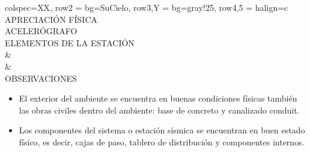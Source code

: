 \begin{tblr}{
        colspec={XX},
        row{2} = {bg=SuCielo},
        row{3,Y} = {bg=gray!25},
        row{4,5} = {halign=c}
    }
     APRECIACIÓN FÍSICA \\
     ACELERÓGRAFO \MakeUppercase{} \\
     ELEMENTOS DE LA ESTACIÓN \\
     &
     \\
     &
     \\
     OBSERVACIONES \\
     \begin{itemize}
        \item El exterior del ambiente se encuentra en buenas condiciones físicas también las obras civiles dentro del ambiente: base de concreto y canalizado conduit.
        \item Los componentes del sistema o estación sísmica se encuentran en buen estado físico, es decir, cajas de paso, tablero de distribución y componentes internos.
    \end{itemize}
\end{tblr}
